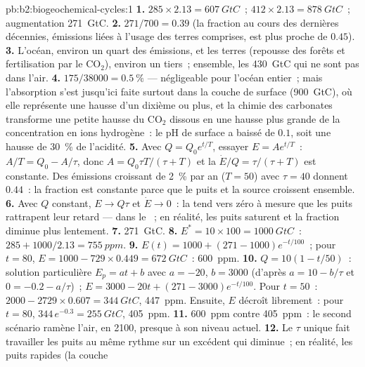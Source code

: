 \begin{solution}{pb:b2:biogeochemical-cycles:1}
\textbf{1.} $285\times 2.13 = \qty{607}{GtC}$~; $412\times 2.13 =
\qty{878}{GtC}$~; augmentation \qty{271}{GtC}.
\textbf{2.} $271/700 = 0.39$ (la fraction au cours des dernières
décennies, émissions liées à l'usage des terres comprises, est plus
proche de $0.45$).
\textbf{3.} L'océan, environ un quart des émissions, et les terres
(repousse des forêts et fertilisation par le $\mathrm{CO_2}$), environ un
tiers~; ensemble, les \qty{430}{GtC} qui ne sont pas dans l'air.
\textbf{4.} $175/38000 = \qty{0.5}{\%}$ --- négligeable pour l'océan
entier~; mais l'absorption s'est jusqu'ici faite surtout dans la couche
de surface (\qty{900}{GtC}), où elle représente une hausse d'un dixième
ou plus, et la chimie des carbonates transforme une petite hausse du
$\mathrm{CO_2}$ dissous en une hausse plus grande de la concentration en ions
hydrogène~: le pH de surface a baissé de $0.1$, soit une hausse de
\qty{30}{\%} de l'acidité.
\textbf{5.} Avec $Q = Q_0 e^{t/T}$, essayer $E = Ae^{t/T}$~: $A/T = Q_0 -
A/\tau$, donc $A = Q_0\tau T/(\tau + T)$ et la 
$\dot E/Q = \tau/(\tau + T)$ est constante. Des émissions croissant de
\qty{2}{\%} par an ($T = 50$) avec $\tau = 40$ donnent $0.44$~: la
fraction est constante parce que le puits et la source croissent ensemble.
\textbf{6.} Avec $Q$ constant, $E \to Q\tau$ et $\dot E \to 0$~: la
 tend vers zéro à mesure que les puits rattrapent
leur retard --- dans le ~; en réalité, les puits
saturent et la fraction diminue plus lentement.
\textbf{7.} \qty{271}{GtC}.
\textbf{8.} $E^{*} = 10\times 100 = \qty{1000}{GtC}$~: $285 +
1000/2.13 = \qty{755}{ppm}$.
\textbf{9.} $E(t) = 1000 + (271 - 1000)e^{-t/100}$~; pour $t = 80$,
$E = 1000 - 729\times 0.449 = \qty{672}{GtC}$~: \qty{600}{ppm}.
\textbf{10.} $Q = 10(1 - t/50)$~: solution particulière $E_p = at + b$
avec $a = -20$, $b = 3000$ (d'après $a = 10 - b/\tau$ et $0 = -0.2 -
a/\tau$)~; $E = 3000 - 20t + (271 - 3000)e^{-t/100}$. Pour $t = 50$~:
$2000 - 2729\times 0.607 = \qty{344}{GtC}$, \qty{447}{ppm}. Ensuite, $E$
décroît librement~: pour $t = 80$, $344\,e^{-0.3} = \qty{255}{GtC}$,
\qty{405}{ppm}.
\textbf{11.} \qty{600}{ppm} contre \qty{405}{ppm}~: le second scénario
ramène l'air, en 2100, presque à son niveau actuel.
\textbf{12.} Le $\tau$ unique fait travailler les puits au même rythme
sur un excédent qui diminue~; en réalité, les puits rapides (la couche

\end{solution}
